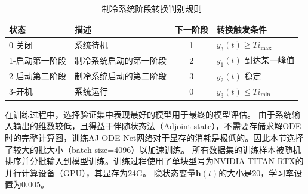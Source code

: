 \begin{table}[]
    \centering
    \caption{制冷系统阶段转换判别规则}
    \label{tab:cooling_dfa}
    \begin{tabular}{llcl}
    \toprule
       状态                  &    描述             & 下一阶段 & 转换触发条件                                   \\ 
       \hline
    0-关闭                       & 系统待机                             & 1          & $y_3(t)\geq Ti_{\max}$                                \\
    1-启动第一阶段                      & 制冷系统启动的第一阶段                     & 2          & $y_1(t)$ 到达某一峰值                            \\
    2-启动第二阶段                       & 制冷系统启动的第二阶段 & 3          & \multicolumn{1}{l}{$y_2(t)$ 稳定} \\
    3-开机                       & 系统运行                                   & 0          & $y_3(t)\leq Ti_{\min}$                                \\
    \bottomrule
    \end{tabular}
\end{table}

在训练过程中，选择验证集中表现最好的模型用于最终的模型评估。
由于系统输入输出的维数较低，且得益于伴随状态法（Adjoint state），不需要存储求解ODE时的完整计算图，训练AJ-ODE-Net网络对于显存的消耗是极低的。因此本节选择了较大的批大小（batch size=4096）以加速训练。
所有数据集的训练样本被随机排序并分批输入到模型训练。训练过程使用了单块型号为NVIDIA TITAN RTX的并行计算设备（GPU），其显存为24G。
隐状态变量$\boldsymbol h(t)$的大小是20，学习率设置为0.005。





